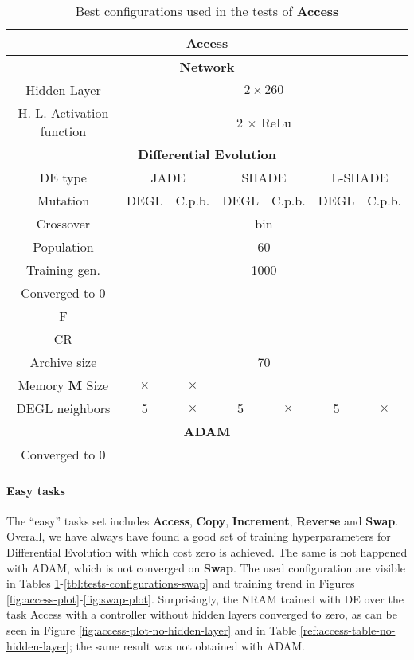 \begin{table}[!h]
	\centering
	\begin{tabular}{|c|c|c|c|c|c|c|}
		\hline
		\multicolumn{7}{|c|}{\textbf{Access}} \\ \hline \hline
		\multicolumn{7}{|c|}{\textbf{Network}} \\ \hline
		Hidden Layer & \multicolumn{6}{c|}{$2 \times 260$}\\ \hline
		H. L. Activation function & \multicolumn{6}{c|}{2 $\times$ ReLu}\\ \hline \hline
		\multicolumn{7}{|c|}{\textbf{Differential Evolution}} \\ \hline
		DE type & \multicolumn{2}{c|}{JADE} & \multicolumn{2}{c|}{SHADE} & \multicolumn{2}{c|}{L-SHADE}  \\ \hline
		Mutation & DEGL & C.p.b. & DEGL & C.p.b. & DEGL & C.p.b. \\ \hline
		Crossover & \multicolumn{6}{c|}{bin} \\ \hline
		Population & \multicolumn{6}{c|}{60} \\ \hline
		Training gen. & \multicolumn{6}{c|}{1000} \\ \hline
		Converged to 0 & & & & & & \\ \hline
		F & & & & & &\\ \hline
		CR & & & & & &\\ \hline
		Archive size & \multicolumn{6}{c|}{70} \\ \hline
		Memory \textbf{M} Size & $\times$ & $\times$ & & & &\\ \hline
		DEGL neighbors & 5 & $\times$ & 5 & $\times$ & 5 & $\times$  \\ \hline\hline
		\multicolumn{7}{|c|}{\textbf{ADAM}} \\ \hline
		Converged to 0 & \multicolumn{6}{|c|}{\checkmark} \\ \hline
 	\end{tabular}
	\caption{Best configurations used in the tests of \textbf{Access}}
	\label{tbl:tests-configurations-access}
\end{table}

\paragraph{Easy tasks}
The ``easy'' tasks set includes \textbf{Access}, \textbf{Copy}, \textbf{Increment}, \textbf{Reverse} and \textbf{Swap}. Overall, we have always have found a good set of training hyperparameters for Differential Evolution with which cost zero is achieved. The same is not happened with ADAM, which is not converged on \textbf{Swap}. The used configuration are visible in Tables \ref{tbl:tests-configurations-access}-\ref{tbl:tests-configurations-swap} and training trend in Figures \ref{fig:access-plot}-\ref{fig:swap-plot}. Surprisingly, the NRAM trained with DE over the task Access with a controller without hidden layers converged to zero, as can be seen in Figure \ref{fig:access-plot-no-hidden-layer} and in Table \ref{ref:access-table-no-hidden-layer}; the same result was not obtained with ADAM.

